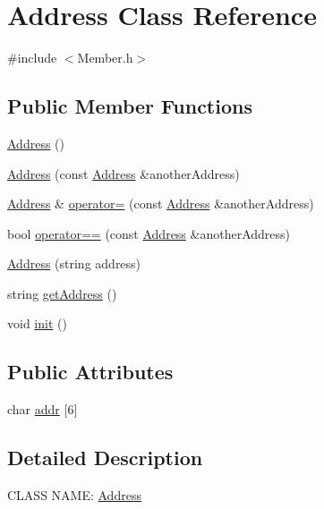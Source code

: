 \hypertarget{class_address}{}\section{Address Class Reference}
\label{class_address}


{\ttfamily \#include $<$Member.\+h$>$}

\subsection*{Public Member Functions}
\begin{DoxyCompactItemize}
\item 
\hyperlink{class_address_a63f910c09d93bdd16d3744e47d13dc0e}{Address} ()
\item 
\hyperlink{class_address_ab14aae7ff0f39b244c4d75e0b96d132d}{Address} (const \hyperlink{class_address}{Address} \&another\+Address)
\item 
\hyperlink{class_address}{Address} \& \hyperlink{class_address_a4c0a8dc60c82758c99eec9a509183e66}{operator=} (const \hyperlink{class_address}{Address} \&another\+Address)
\item 
bool \hyperlink{class_address_ab0cbc2009a68a7062e70cb258363e5d7}{operator==} (const \hyperlink{class_address}{Address} \&another\+Address)
\item 
\hyperlink{class_address_a6915aea64cda2c642130616d1348969d}{Address} (string address)
\item 
string \hyperlink{class_address_a81c2bb60d0be5733eef6fa521775e06b}{get\+Address} ()
\item 
void \hyperlink{class_address_af95a4eb279d001262fa268e7f46bdd83}{init} ()
\end{DoxyCompactItemize}
\subsection*{Public Attributes}
\begin{DoxyCompactItemize}
\item 
char \hyperlink{class_address_a19157536e8e684b3db6b73aa312a057c}{addr} \mbox{[}6\mbox{]}
\end{DoxyCompactItemize}


\subsection{Detailed Description}
C\+L\+A\+S\+S N\+A\+M\+E\+: \hyperlink{class_address}{Address}

